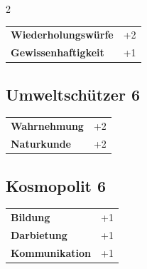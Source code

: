 \begin{multicols}{2}
\begin{tcolorbox}
\begin{tabular}{@{}ll@{}}
    \textbf{Wiederholungswürfe} & +2\\
    \textbf{Gewissenhaftigkeit} & +1\\
\end{tabular}


\end{tcolorbox}

\begin{tcolorbox}
    \subsection*{Umweltschützer \hfill \small{6 }}
    \tcblower




\begin{tabular}{@{}ll@{}}
    \textbf{Wahrnehmung} & +2\\
    \textbf{Naturkunde} & +2\\
\end{tabular}


\end{tcolorbox}

\begin{tcolorbox}
    \subsection*{Kosmopolit \hfill \small{6 }}
    \tcblower




\begin{tabular}{@{}ll@{}}
    \textbf{Bildung} & +1\\
    \textbf{Darbietung} & +1\\
    \textbf{Kommunikation} & +1\\
\end{tabular}



\end{tcolorbox}
\end{multicols}
